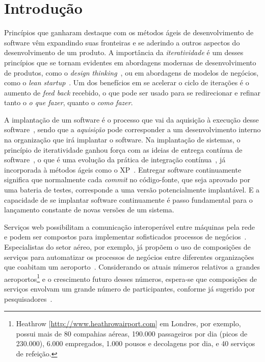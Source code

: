 \chapter{Introdução}
\label{cap:introducao}

Princípios que ganharam destaque com os métodos ágeis de desenvolvimento
de software vêm expandindo suas fronteiras e se aderindo a outros aspectos
do desenvolvimento de um produto. A importância da \emph{iteratividade}
é um desses princípios que se tornam evidentes em abordagens modernas de
desenvolvimento de produtos, como o \emph{design thinking}~\cite{Brown2009DesignThinking},
ou em abordagens de modelos de negócios, como o \emph{lean startup}~\cite{Ries2011Lean}.
Um dos benefícios em se acelerar o ciclo de iterações é o aumento
de \emph{feed back} recebido, o que pode ser usado
para se redirecionar e refinar tanto o \emph{o que fazer}, 
quanto o \emph{como fazer}.

A implantação de um software é o
processo que vai da aquisição à
execução desse software~\cite{DEPL2006},
sendo que a \emph{aquisição} pode corresponder 
a um desenvolvimento interno na organização que irá implantar o software.
Na implantação de sistemas, 
o princípio de iteratividade
ganhou força com as ideias de entrega contínua de software~\cite{Humble2011Continuous},
o que é uma evolução da prática de integração contínua~\cite{Duvall2007Integration}, 
já incorporada à métodos ágeis como o XP~\cite{Beck1999XP}.
Entregar software continuamente significa que normalmente cada \emph{commit}
no código-fonte, que seja aprovado por uma bateria de testes,
corresponde a uma versão potencialmente implantável.
E a capacidade de se implantar software continuamente é passo fundamental
para o lançamento constante de novas versões de um sistema.

Serviços web possibilitam a comunicação interoperável entre máquinas pela rede~\cite{W3C2004WS}
e podem ser compostos para implementar sofisticados processos de negócios~\cite{Papazoglou2007State}.
Especialistas do setor aéreo, por exemplo, já propõem o uso de composições de serviços
para automatizar os processos de negócios entre diferentes organizações
que coabitam um aeroporto~\cite{Choreos2012D6.2}.
Considerando os atuais números relativos a grandes
aeroportos\footnote{Heathrow [\url{http://www.heathrowairport.com}] em Londres, por exemplo, 
possui mais de 80 compahias aéreas, 190.000 passageiros por dia (picos de 230.000),
6.000 empregados, 1.000 pousos e decolagens por dia, e 40 serviços de refeição.}
e o crescimento futuro desses números, espera-se que
composições de serviços envolvam um grande número de participantes,
conforme já sugerido por 
pesquisadores~\cite{Valerie2011FutureInternet,Papadimitriou2009FutureInternet}.

